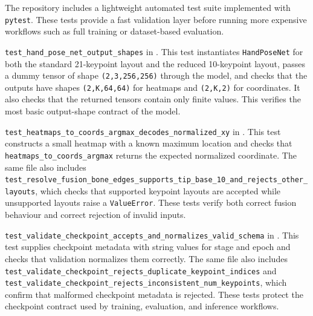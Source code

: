 ﻿\documentclass[11pt,a4paper]{article}
\begin{document}
The repository includes a lightweight automated test suite implemented with
\texttt{pytest}. These tests provide a fast validation layer
before running more expensive workflows such as full training or dataset-based
evaluation.

\medskip

\texttt{test\_hand\_pose\_net\_output\_shapes} in
. This test instantiates
\texttt{HandPoseNet} for both the standard 21-keypoint layout and the reduced
10-keypoint layout, passes a dummy tensor of shape \texttt{(2,3,256,256)}
through the model, and checks that the outputs have shapes
\texttt{(2,K,64,64)} for heatmaps and \texttt{(2,K,2)} for coordinates. It
also checks that the returned tensors contain only finite values. This
verifies the most basic output-shape contract of the model.

\medskip

\texttt{test\_heatmaps\_to\_coords\_argmax\_decodes\_normalized\_xy} in
. This test constructs a small heatmap with a known
maximum location and checks that \texttt{heatmaps\_to\_coords\_argmax}
returns the expected normalized coordinate. The same file also includes
\texttt{test\_resolve\_fusion\_bone\_edges\_supports\_tip\_base\_10\_and\_rejects\_other\_layouts},
which checks that supported keypoint layouts are accepted while unsupported
layouts raise a \texttt{ValueError}. These tests verify both correct fusion
behaviour and correct rejection of invalid inputs.

\medskip

\texttt{test\_validate\_checkpoint\_accepts\_and\_normalizes\_valid\_schema} in
. This test supplies checkpoint metadata with
string values for stage and epoch and checks that validation normalizes them
correctly. The same file also includes
\texttt{test\_validate\_checkpoint\_rejects\_duplicate\_keypoint\_indices} and
\texttt{test\_validate\_checkpoint\_rejects\_inconsistent\_num\_keypoints},
which confirm that malformed checkpoint metadata is rejected. These tests
protect the checkpoint contract used by training, evaluation, and inference
workflows.
\end{document}
